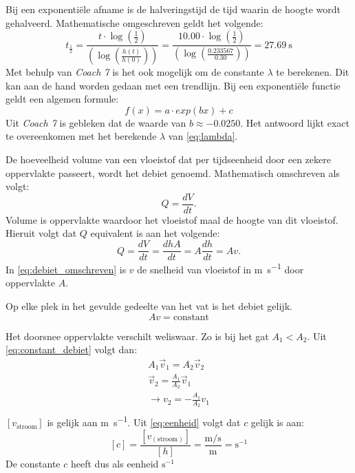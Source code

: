 \documentclass{scrartcl}
\begin{document}
Bij een exponentiële afname is de halveringstijd de tijd waarin de hoogte wordt gehalveerd. Mathematische omgeschreven geldt het volgende:
\begin{equation}\label{eq:half}
t_{\frac{1}{2}} = \frac{t \cdot \log(\frac{1}{2})}{\left(\log \left(\frac{h(t)}{h(0)}\right)\right)} = \frac{10.00 \cdot \log(\frac{1}{2})}{\left(\log \left(\frac{0.233567}{0.30}\right)\right)} = \SI{27.69}{\second}
\end{equation}
Met behulp van \textit{Coach 7} is het ook mogelijk om de constante $\lambda$ te berekenen. Dit kan aan de hand worden gedaan met een trendlijn. Bij een exponentiële functie geldt een algemen formule:
\begin{equation}
    f(x) = a \cdot exp(bx) + c
\end{equation}
Uit \textit{Coach 7} is gebleken dat de waarde van $b \approx-0.0250$. Het antwoord lijkt exact te overeenkomen met het berekende $\lambda$ van \cref{eq:lambda}. 










\newpage
De hoeveelheid volume van een vloeistof dat per tijdseenheid door een zekere oppervlakte passeert, wordt het debiet genoemd. Mathematisch omschreven als volgt:
\begin{equation}\label{eq:debiet}
    Q = \frac{dV}{dt}.
\end{equation}
Volume is oppervlakte waardoor het vloeistof maal de hoogte van dit vloeistof. Hieruit volgt dat $Q$ equivalent is aan het volgende:
\begin{equation}\label{eq:debiet_omschreven}
    Q = \frac{dV}{dt} = \frac{dhA}{dt} = A\frac{dh}{dt} = Av.
\end{equation}
In \cref{eq:debiet_omschreven} is $v$ de snelheid van vloeistof in \si{\meter\per\second} door oppervlakte $A$.

Op elke plek in het gevulde gedeelte van het vat is het debiet gelijk. 
\begin{equation}\label{eq:constant_debiet}
    Av = \text{constant}
\end{equation}

Het doorsnee oppervlakte verschilt weliswaar. Zo is bij het gat $A_1 < A_2$. Uit \cref{eq:constant_debiet} volgt dan:
\begin{equation}\label{eq:v_h}
\begin{split}
    A_1\vec{v}_1 = A_2\vec{v}_2\\
    \vec{v}_2 = \frac{A_1}{A_2}\vec{v}_1\\
     \rightarrow v_2 = -\frac{A_1}{A_2}v_1\\
    \end{split}
    \end{equation}
$[v_{\text{stroom}}]$ is gelijk aan \si{\meter\per\second}. Uit \cref{eq:eenheid} volgt dat $c$ gelijk is aan:
\begin{equation}\label{eq:eenheid}
[c] = \frac{[v_{(\text{stroom})}]}{[h]} = \frac{\si{\meter\per\second}}{\si{\meter}} = \si{\second}^{-1}
\end{equation}
De constante $c$ heeft dus als eenheid $\si{\second}^{-1}$
\end{document}
